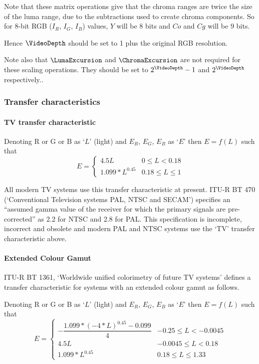 \begin{informative*}
Note that these matrix operations give that the chroma ranges are twice the
size of the luma range, due to the subtractions used to create chroma components. 
So for 8-bit RGB ($I_R$, $I_G$, $I_B$) values, $Y$ will be 8 bits and $Co$ and
$Cg$ will be 9 bits. 

Hence $\VideoDepth$ should be set to 1 plus the original RGB resolution.

Note also that $\LumaExcursion$ and $\ChromaExcursion$ are not required for
these scaling operations. They should be set to $2^\VideoDepth-1$ and $2^\VideoDepth$
respectively..

\subsubsection{Transfer characteristics}
\paragraph{TV transfer characteristic\\}

Denoting R or G or B as `$L$' (light) and $E_R$, $E_G$, $E_B$ as
`$E$' then $E=f(L)$ such that
\[
E=\left\{
        \begin{array}{ll}
        4.5L & 0\leq L<0.18\\
        1.099*L^{0.45} &0.18\leq L \leq 1
        \end{array}
  \right.
\]

All modern TV systems use this transfer characteristic at present. ITU-R
BT 470 (`Conventional Television systems PAL, NTSC and SECAM') specifies
an ``assumed gamma value of the receiver for which the primary
signals are pre-corrected'' as 2.2 for NTSC and 2.8 for PAL. This
specification is incomplete, incorrect and obsolete and modern PAL and
NTSC systems use the `TV' transfer characteristic above.

\paragraph{Extended Colour Gamut\\}

ITU-R BT 1361, `Worldwide unified colorimetry of future TV systems'
defines a transfer characteristic for systems with an extended colour
gamut as follows.

Denoting R or G or B as `$L$' (light) and $E_R$, $E_G$, $E_B$ as
`$E$' then $E=f(L)$ such that
\[
E=\left\{
        \begin{array}{ll}
        -\dfrac{1.099*(-4*L)^{0.45}-0.099}{4} & -0.25\leq L<-0.0045\\
        4.5L & -0.0045\leq L<0.18\\
        1.099*L^{0.45} &0.18\leq L \leq 1.33
        

\end{array}\]
\end{informative*}
